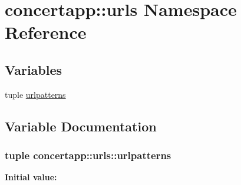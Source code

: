 \hypertarget{namespaceconcertapp_1_1urls}{
\section{concertapp::urls Namespace Reference}
\label{namespaceconcertapp_1_1urls}
}
\subsection*{Variables}
\begin{DoxyCompactItemize}
\item 
tuple \hyperlink{namespaceconcertapp_1_1urls_ae3a6e0b438e844c08d6b1c8324c9abf7}{urlpatterns}
\end{DoxyCompactItemize}


\subsection{Variable Documentation}
\hypertarget{namespaceconcertapp_1_1urls_ae3a6e0b438e844c08d6b1c8324c9abf7}{
\subsubsection[{urlpatterns}]{\setlength{\rightskip}{0pt plus 5cm}tuple {\bf concertapp::urls::urlpatterns}}}
\label{namespaceconcertapp_1_1urls_ae3a6e0b438e844c08d6b1c8324c9abf7}
{\bfseries Initial value:}
